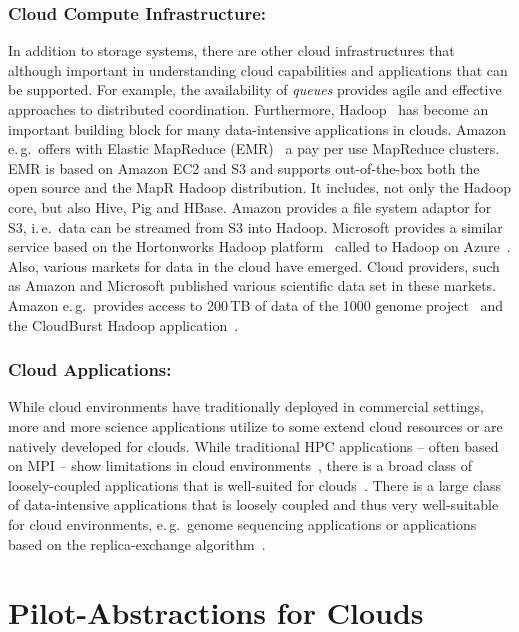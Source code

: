 \documentclass[times]{cpeauth}
\begin{document}
\subsubsection*{Cloud Compute Infrastructure:} In addition to storage systems,
there are other cloud infrastructures that although important in
understanding cloud capabilities and applications that can be
supported. For example, the availability of {\it queues} provides
agile and effective approaches to distributed coordination.
Furthermore, Hadoop~\cite{hadoop} has become an important building
block for many data-intensive applications in clouds. Amazon
e.\,g.\ offers with Elastic MapReduce (EMR)~\cite{amazonemr} a pay per
use MapReduce clusters. EMR is based on Amazon EC2 and S3 and supports
out-of-the-box both the open source and the MapR Hadoop
distribution. It includes, not only the Hadoop core, but also Hive,
Pig and HBase. Amazon provides a file system adaptor for S3,
i.\,e.\ data can be streamed from S3 into Hadoop. Microsoft provides a
similar service based on the Hortonworks Hadoop
platform~\cite{hortonworks} called to Hadoop on
Azure~\cite{hadooponazure}. Also, various markets for data in the
cloud have emerged. Cloud providers, such as Amazon and Microsoft
published various scientific data set in these markets. Amazon
e.\,g.\ provides access to 200\,TB of data of the 1000 genome
project~\cite{amazon-1000genomes} and the CloudBurst Hadoop
application~\cite{schatz2009}. 


\subsubsection*{Cloud Applications:}
While cloud environments have traditionally deployed in commercial
settings, more and more science applications utilize to some extend
cloud resources or are natively developed for clouds. While
traditional HPC applications -- often based on MPI -- show limitations
in cloud
environments~\cite{Evangelinos2008,Mehrotra:2012:PEA:2287036.2287045},
there is a broad class of loosely-coupled applications that is
well-suited for clouds~\cite{1851544,Sehgal2011590}. There is a large
class of data-intensive applications that is loosely coupled and thus
very well-suitable for cloud environments, e.\,g.\ genome sequencing
applications or applications based on the replica-exchange
algorithm~\cite{bigjob_cloudcom10}.



\section{Pilot-Abstractions for Clouds}
\end{document}
